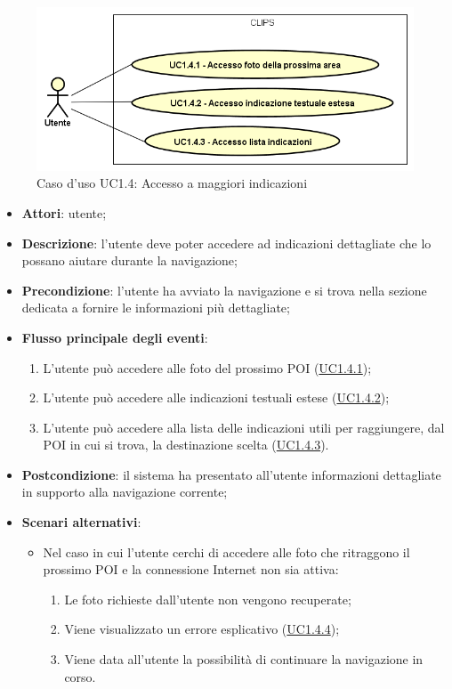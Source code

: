 \documentclass[../AnalisiDeiRequisiti.tex]{subfiles}
\begin{document}
\begin{figure}[H]
	\centering
	\includegraphics[scale=0.95, width=\textwidth]{img/UC1-4.png}
	\caption{Caso d'uso UC1.4: Accesso a maggiori indicazioni}\label{fig:UC1.4} 
\end{figure}
\begin{itemize}
	\item \textbf{Attori}: utente;
	\item \textbf{Descrizione}: l'utente deve poter accedere ad indicazioni dettagliate che lo possano aiutare durante la navigazione; 
	\item \textbf{Precondizione}: l'utente ha avviato la navigazione e si trova nella sezione dedicata a fornire le informazioni più dettagliate;
	
	\item \textbf{Flusso principale degli eventi}:
	\begin{enumerate}
		\item L'utente può accedere alle foto del prossimo POI (\hyperlink{UC1.4.1}{UC1.4.1});
		\item L'utente può accedere alle indicazioni testuali estese (\hyperlink{UC1.4.2}{UC1.4.2});
		\item L'utente può accedere alla lista delle indicazioni utili per raggiungere, dal POI in cui si trova, la destinazione scelta (\hyperlink{UC1.4.3}{UC1.4.3}).
		
	\end{enumerate}
	\item \textbf{Postcondizione}: il sistema ha presentato all'utente informazioni dettagliate in supporto alla navigazione corrente;
	\item \textbf{Scenari alternativi}: 
	\begin{itemize}
		\item Nel caso in cui l'utente cerchi di accedere alle foto che ritraggono il prossimo POI e la connessione Internet non sia attiva: 
		\begin{enumerate}
			\item Le foto richieste dall'utente non vengono recuperate;
			\item Viene visualizzato un errore esplicativo (\hyperlink{UC1.4.4}{UC1.4.4});
			\item Viene data all'utente la possibilità di continuare la navigazione in corso.
		\end{enumerate}
	\end{itemize}
\end{itemize}
\hypertarget{UC1.4.1}{}
\end{document}
